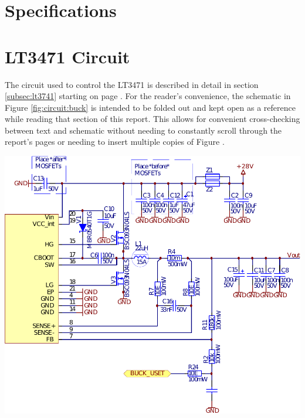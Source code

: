 \clearpage
\section{Specifications}
\label{appendix:specs}



{%
    \clearpage
    \pdfpagewidth
    \textwidth
    \addtolength{\textwidth}{50mm}

    \section{LT3471 Circuit}
    \label{appendix:lt3741:circuit}

    \begin{minipage}[b]{.5\textwidth}
        The   circuit    used   to    control   the   LT3471    is   described
        in   detail   in   section  \ref{subsec:lt3741}   starting   on   page
        \pageref{subsec:lt3741}. For the  reader's convenience,  the schematic
        in Figure \ref{fig:circuit:buck} is intended to be folded out and kept
        open as  a reference while  reading that section of  this report. This
        allows  for  convenient  cross-checking  between  text  and  schematic
        without needing  to constantly  scroll through  the report's  pages or
        needing to insert multiple copies of Figure \label{fig:circuit:buck}.
    \end{minipage}%
    \begin{minipage}[b]{.5\textwidth}
        \center
        \includegraphics[width=.67\textwidth]{images/circuit/buck.pdf}
        \label{fig:circuit:buck}
    \end{minipage}

\clearpage
}

